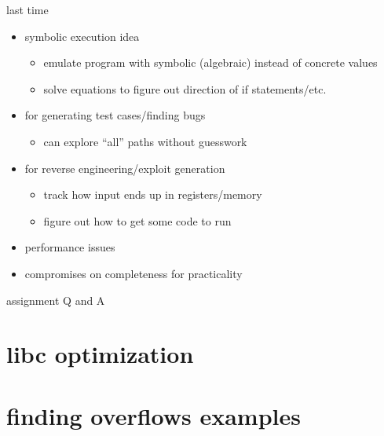 \date{}
\title{}
\date{}
\usepackage[outputdir=latex.out]{minted}

\begin{frame}
    \titlepage
\end{frame}



\begin{frame}{last time}
    \begin{itemize}
    \item symbolic execution idea
        \begin{itemize}
        \item emulate program with symbolic (algebraic) instead of concrete values
        \item solve equations to figure out direction of if statements/etc.
        \end{itemize}
    \item for generating test cases/finding bugs
        \begin{itemize}
        \item can explore ``all'' paths without guesswork
        \end{itemize}
    \item for reverse engineering/exploit generation
        \begin{itemize}
        \item track how input ends up in registers/memory
        \item figure out how to get some code to run
        \end{itemize}
    \item performance issues 
    \item compromises on completeness for practicality
    \end{itemize}
\end{frame}

\begin{frame}{assignment Q and A}
\end{frame}


\section{libc optimization}


\section{finding overflows examples}


